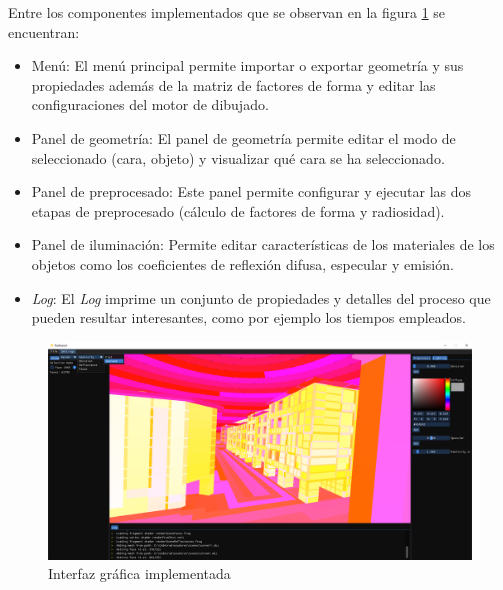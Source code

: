 Entre los componentes implementados que se observan en la figura \ref{img:ui-ex} se encuentran:

\begin{itemize}
	\item Menú: El menú principal permite importar o exportar geometría y sus propiedades además de la matriz de factores de forma y editar las configuraciones del motor de dibujado.
	\item Panel de geometría: El panel de geometría permite editar el modo de seleccionado (cara, objeto) y visualizar qué cara se ha seleccionado.
	\item Panel de preprocesado: Este panel permite configurar y ejecutar las dos etapas de preprocesado (cálculo de factores de forma y radiosidad).
	\item Panel de iluminación: Permite editar características de los materiales de los objetos como los coeficientes de reflexión difusa, especular y emisión.
	\item \textit{Log}: El \textit{Log} imprime un conjunto de propiedades y detalles del proceso que pueden resultar interesantes, como por ejemplo los tiempos empleados.
\end{itemize}

\begin{figure}[H]
	\centering
	\includegraphics[width=1\linewidth]{assets/ui-ex}
	\caption{Interfaz gráfica implementada}
	\label{img:ui-ex}
\end{figure}